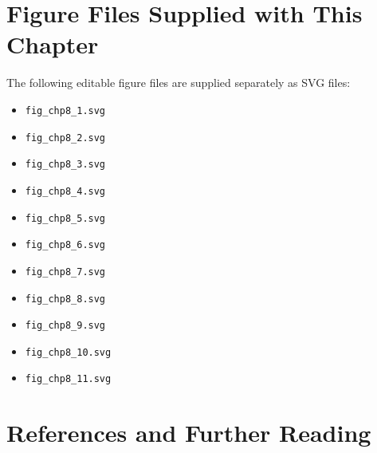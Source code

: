 \documentclass[11pt]{article}
\begin{document}
\section{Figure Files Supplied with This Chapter}

The following editable figure files are supplied separately as SVG files:
\begin{itemize}[leftmargin=1.4em]
  \item \texttt{fig\_chp8\_1.svg}
  \item \texttt{fig\_chp8\_2.svg}
  \item \texttt{fig\_chp8\_3.svg}
  \item \texttt{fig\_chp8\_4.svg}
  \item \texttt{fig\_chp8\_5.svg}
  \item \texttt{fig\_chp8\_6.svg}
  \item \texttt{fig\_chp8\_7.svg}
  \item \texttt{fig\_chp8\_8.svg}
  \item \texttt{fig\_chp8\_9.svg}
  \item \texttt{fig\_chp8\_10.svg}
  \item \texttt{fig\_chp8\_11.svg}
\end{itemize}

\section{References and Further Reading}
\end{document}
